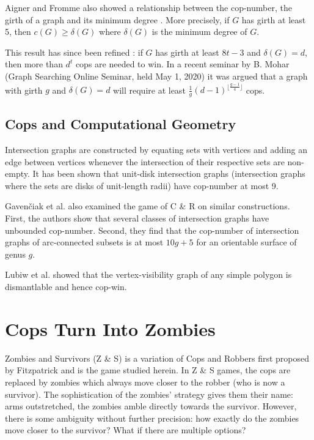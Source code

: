 Aigner and Fromme also showed a relationship between the cop-number, the girth of a graph and
its minimum degree \cite{aigner1984game}. More precisely, if $G$ has girth at least 5, then $c(G)\geq \delta(G)$ where $\delta(G)$ is the minimum degree of $G$.

This result has since been refined \cite{frankl1987cops}: if $G$ has girth at least $8t-3$ and $\delta(G) = d$, then more than $d^t$ cops are needed to win. In a recent
seminar by B. Mohar (Graph Searching Online Seminar, held May 1, 2020) it was
argued that a graph with girth $g$ and $\delta(G)=d$ will require at least $\tfrac{1}{g}(d-1)^{\lfloor \frac{g-1}{4} \rfloor}$ cops.

\subsection{Cops and Computational Geometry}

Intersection graphs are constructed by equating sets with vertices and adding an edge between vertices whenever the intersection of their respective sets are non-empty. It has been shown \cite{beveridge2011cops} that unit-disk intersection graphs (intersection graphs where the sets are disks of unit-length radii) have cop-number at most 9.

Gaven{\v{c}}iak et al. \cite{gavenvciak2018cops} also examined the game of C \& R on similar constructions. First, the authors show that several classes of intersection graphs have unbounded cop-number. Second, they find that the cop-number of intersection graphs of arc-connected subsets is at most $10g+5$ for an orientable surface of genus $g$.

Lubiw et al. \cite{lubiw2017visibility} showed that the vertex-visibility graph of any simple polygon is dismantlable and hence cop-win.

\section{Cops Turn Into Zombies}

Zombies and Survivors (Z \& S) is a variation of Cops and Robbers first proposed by Fitzpatrick \cite{fitzpatrick2016deterministic} and is the game studied herein. In Z \& S games, the
cops are replaced by zombies which always move closer to the robber (who is now a survivor). The sophistication of the zombies' strategy gives them their name:  arms outstretched, the zombies amble directly towards the survivor. However, there is some ambiguity without further precision: how exactly do the zombies move closer to the survivor? What if there are multiple options?

